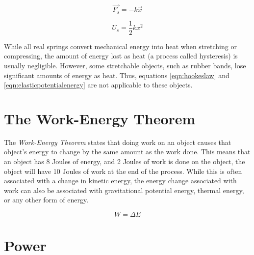 	
		\begin{mdframed}[backgroundcolor=orange!20!white]
		\begin{equation}
		\overrightarrow{F_s} = -k\vec{x}
		\label{eqn:hookeslaw}
		\end{equation}
	\end{mdframed}
	
	
	\begin{mdframed}[backgroundcolor=orange!20!white]
		\begin{equation}
		U_s = \frac{1}{2}kx^2
		\label{eqn:elasticpotentialenergy}
		\end{equation}
	\end{mdframed}

	While all real springs convert mechanical energy into heat when stretching or compressing, the amount of energy lost as heat (a process called hysteresis) is usually negligible.  However, some stretchable objects, such as rubber bands, lose significant amounts of energy as heat.  Thus, equations \ref{eqn:hookeslaw} and \ref{eqn:elasticpotentialenergy} are not applicable to these objects.  
	

	
	\section{The Work-Energy Theorem}
	The \textit{Work-Energy Theorem} states that doing work on an object causes that object's energy to change by the same amount as the work done.  This means that an object has 8 Joules of energy, and 2 Joules of work is done on the object, the object will have 10 Joules of work at the end of the process.  	While this is often associated with a change in kinetic energy, the energy change associated with work can also be associated with gravitational potential energy, thermal energy, or any other form of energy.  
	
		\begin{mdframed}[backgroundcolor=orange!20!white]
		\begin{equation}
			W = \Delta E
			\label{equation:workenergy}
		\end{equation}
	\end{mdframed}
	
		\section{Power}
	
